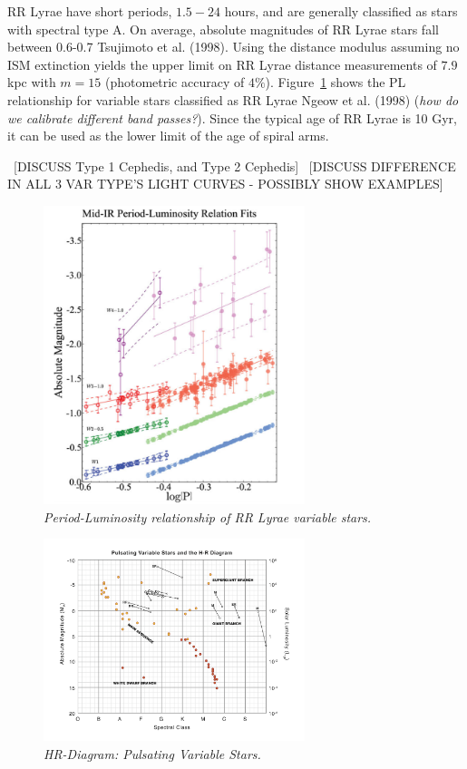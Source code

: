 \documentclass[letterpaper,11pt]{article}
\begin{document}
RR Lyrae have short periods, $1.5 - 24$ hours, and are generally classified as stars with spectral type A.  On average, absolute magnitudes of RR Lyrae stars fall between 0.6-0.7 Tsujimoto et al. (1998). Using the distance modulus assuming no ISM extinction yields the upper limit on RR Lyrae distance measurements of $7.9$ kpc with $m=15$ (photometric accuracy of $4\%$). Figure~\ref{fig:plrelationrrlyrae} shows the PL relationship for variable stars classified as RR Lyrae Ngeow et al. (1998) (\textit{how do we calibrate different band passes?}). Since the typical age of RR Lyrae is 10 Gyr, it can be used as the lower limit of the age of spiral arms.  

~[DISCUSS Type 1 Cephedis, and Type 2 Cephedis]
~[DISCUSS DIFFERENCE IN ALL 3 VAR TYPE'S LIGHT CURVES - POSSIBLY SHOW EXAMPLES]

\begin{figure}[htb!]
  \begin{center}
\centerline{\includegraphics[width=3in]{figures/PL_relation}}
\caption{\it \small{Period-Luminosity relationship of RR Lyrae variable stars. \label{fig:plrelationrrlyrae}}}
  \end{center}
\end{figure}
\begin{figure}[htb!]
  \begin{center}
\centerline{\includegraphics[width=3in]{figures/var_star_HR.png}}
\caption{\it \small{HR-Diagram: Pulsating Variable Stars. \label{fig:var-star-hr}}}
  \end{center}
\end{figure}
\end{document}
